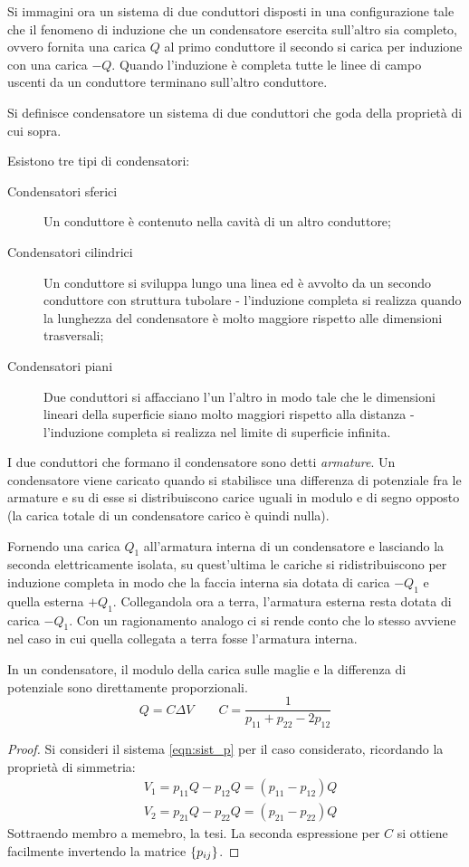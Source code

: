 Si immagini ora un sistema di due conduttori disposti in una configurazione tale che il fenomeno di induzione che un condensatore
esercita sull'altro sia completo, ovvero fornita una carica $Q$ al primo conduttore il secondo si carica per induzione con una
carica $-Q$. Quando l'induzione è completa tutte le linee di campo uscenti da un conduttore terminano sull'altro conduttore.
\begin{defn}[Condensatore]
    Si definisce condensatore un sistema di due conduttori che goda della proprietà di cui sopra.
\end{defn}
Esistono tre tipi di condensatori:
\begin{description}
    \item[Condensatori sferici] Un conduttore è contenuto nella cavità di un altro conduttore;
    \item[Condensatori cilindrici] Un conduttore si sviluppa lungo una linea ed è avvolto da un secondo conduttore con struttura
        tubolare - l'induzione completa si realizza quando la lunghezza del condensatore è molto maggiore rispetto alle dimensioni trasversali;
    \item[Condensatori piani] Due conduttori si affacciano l'un l'altro in modo tale che le dimensioni lineari della superficie siano
        molto maggiori rispetto alla distanza - l'induzione completa si realizza nel limite di superficie infinita.
\end{description}
I due conduttori che formano il condensatore sono detti \textit{armature}. Un condensatore viene caricato quando si stabilisce
una differenza di potenziale fra le armature e su di esse si distribuiscono carice uguali in modulo e di segno opposto
(la carica totale di un condensatore carico è quindi nulla).

Fornendo una carica $Q_1$ all'armatura interna di un condensatore e lasciando la seconda elettricamente isolata,
su quest'ultima le cariche si ridistribuiscono per induzione completa in modo che la faccia interna sia dotata di carica $-Q_1$
e quella esterna $+Q_1$. Collegandola ora a terra, l'armatura esterna resta dotata di carica $-Q_1$.
Con un ragionamento analogo ci si rende conto che lo stesso avviene nel caso in cui quella collegata a terra fosse l'armatura interna.
\begin{thm}
    In un condensatore, il modulo della carica sulle maglie e la differenza di potenziale sono direttamente proporzionali.
    \[
        Q=C\Delta V \quad\quad C=\frac{1}{p_{11}+p_{22}-2p_{12}}
    \]
\end{thm}
\begin{proof}
    Si consideri il sistema \ref{eqn:sist_p} per il caso considerato, ricordando la proprietà di simmetria:
    \[
        \begin{split}
            & V_1=p_{11}Q-p_{12}Q=(p_{11}-p_{12})Q\\
            & V_2=p_{21}Q-p_{22}Q=(p_{21}-p_{22})Q
        \end{split}
    \]
    Sottraendo membro a memebro, la tesi. La seconda espressione per $C$ si ottiene facilmente invertendo la matrice $\Bqty{p_{ij}}$.
\end{proof}

